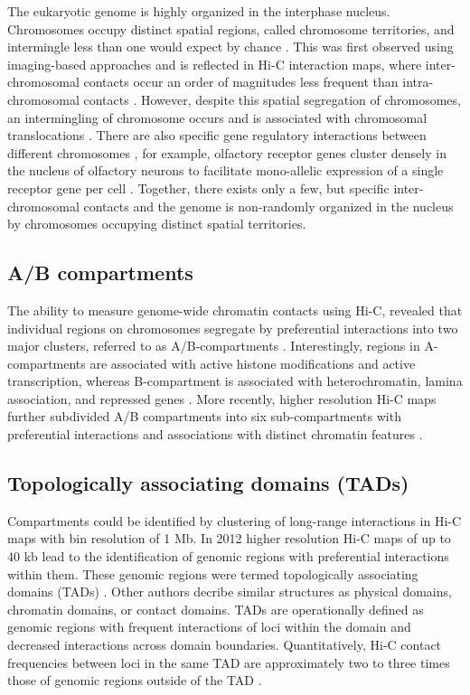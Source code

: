 \documentclass[a4paper,twoside=true,openright,parskip=full,chapterprefix=true,11pt,headings=normal,bibliography=totoc,listof=totoc,titlepage=on,captions=tableabove,draft=false]{scrreprt}
\theoremstyle{definition}
\theoremstyle{definition}
\theoremstyle{definition}
\theoremstyle{remark}
\begin{document}
The eukaryotic genome is highly organized in the interphase nucleus.
Chromosomes occupy distinct spatial regions, called chromosome
territories, and intermingle less than one would expect by chance
\citep{Cremer2001}. This was first observed using imaging-based
approaches and is reflected in Hi-C interaction maps, where
inter-chromosomal contacts occur an order of magnitudes less frequent
than intra-chromosomal contacts \citep{Lieberman-Aiden2009}. However,
despite this spatial segregation of chromosomes, an intermingling of
chromosome occurs and is associated with chromosomal translocations
\citep{Branco2006, Roukos2013, Roukos2014}. There are also specific gene
regulatory interactions between different chromosomes
\citep{DeLaat2007}, for example, olfactory receptor genes cluster
densely in the nucleus of olfactory neurons to facilitate mono-allelic
expression of a single receptor gene per cell \citep{Monahan2015}.
Together, there exists only a few, but specific inter-chromosomal
contacts and the genome is non-randomly organized in the nucleus by
chromosomes occupying distinct spatial territories.

\hypertarget{ab-compartments}{%
\subsection{A/B compartments}\label{ab-compartments}}

The ability to measure genome-wide chromatin contacts using Hi-C,
revealed that individual regions on chromosomes segregate by
preferential interactions into two major clusters, referred to as
A/B-compartments \citep{Lieberman-Aiden2009}. Interestingly, regions in
A-compartments are associated with active histone modifications and
active transcription, whereas B-compartment is associated with
heterochromatin, lamina association, and repressed genes
\citep{Bonev2016}. More recently, higher resolution Hi-C maps further
subdivided A/B compartments into six sub-compartments with preferential
interactions and associations with distinct chromatin features
\citep{Rao2014}.

\hypertarget{topologically-associating-domains-tads}{%
\subsection{Topologically associating domains
(TADs)}\label{topologically-associating-domains-tads}}

Compartments could be identified by clustering of long-range
interactions in Hi-C maps with bin resolution of 1 Mb. In 2012 higher
resolution Hi-C maps of up to 40 kb lead to the identification of
genomic regions with preferential interactions within them. These
genomic regions were termed topologically associating domains (TADs)
\citep{Dixon2012, Nora2012, Sexton2012}. Other authors decribe similar
structures as physical domains, chromatin domains, or contact domains.
TADs are operationally defined as genomic regions with frequent
interactions of loci within the domain and decreased interactions across
domain boundaries. Quantitatively, Hi-C contact frequencies between loci
in the same TAD are approximately two to three times those of genomic
regions outside of the TAD \citep{Merkenschlager2016}.
\end{document}
